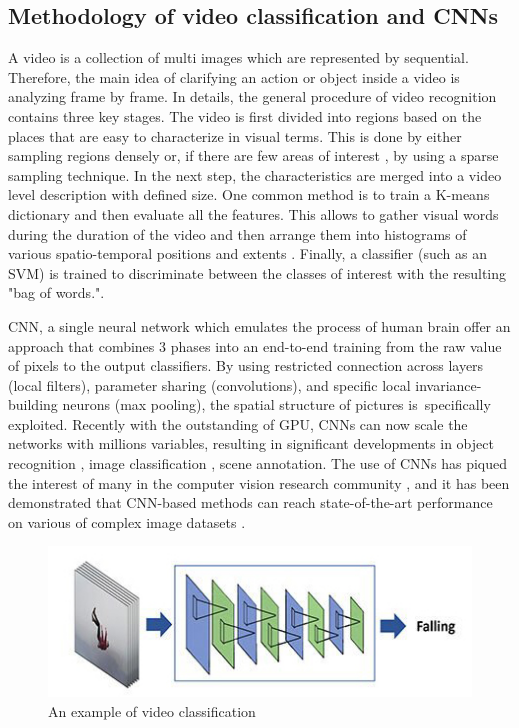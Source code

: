 \documentclass[a4paper, 12pt]{article}
\begin{document}
\subsection{Methodology of video classification and CNNs}
A video is a collection of multi images which are represented by sequential. Therefore, the main idea of clarifying an action or object inside a video is analyzing frame by frame. In details, the general procedure of video recognition \citep{sivic2003video,niebles2010modeling} contains three key stages. 
The video is first divided into regions \citep{liu2009recognizing} based on the places that are easy to characterize in visual terms. This is done by either sampling regions densely \citep{wang2013action} or, if there are few areas of interest \citep{laptev2005space}, by using a sparse sampling technique. 
In the next step, the characteristics are merged into a video level description with defined size. One common method is to train a K-means dictionary and then evaluate all the features. This allows to gather visual words during the duration of the video and then arrange them into histograms of various spatio-temporal positions and extents \citep{karpathy2014large,laptev2008learning}.
Finally, a classifier (such as an SVM) is trained to discriminate between the classes of interest with the resulting "bag of words.".

CNN, a single neural network which emulates the process of human brain \citep{lecun1998gradient} offer an approach that combines 3 phases into an end-to-end training from the raw value of pixels to the output classifiers. By using restricted connection across layers (local filters), parameter sharing (convolutions), and specific local invariance-building neurons (max pooling), the spatial structure of pictures is specifically exploited. Recently with the outstanding of GPU, CNNs can now scale the networks with millions variables, resulting in significant developments in object recognition \citep{girshick2014rich}, image classification \citep{krizhevsky2017imagenet}, scene annotation. The use of CNNs has piqued the interest of many in the computer vision research community \citep{zha2015exploiting}, and it has been demonstrated that CNN-based methods can reach state-of-the-art performance on various of complex image datasets \citep{sharif2014cnn}.

\begin{figure}[H]
    \centering
    \includegraphics[width=1\textwidth]{Video_classification_and_human_activity_recognition.jpg}
    \caption{An example of video classification}
    \label{Figure of video classification}
\end{figure}
\end{document}

